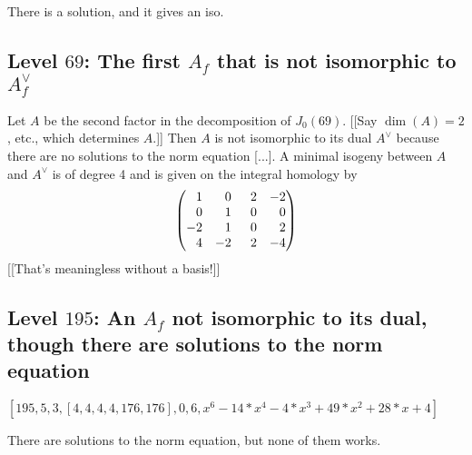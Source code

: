 \documentclass{article}
\begin{document}
There is a solution, and it gives an iso.

\subsection{Level $69$: The first $A_f$ that is not
isomorphic to $A_f^{\vee}$}


Let $A$ be the second factor in the decomposition of $J_0(69)$.
	[[Say $\dim(A) = 2$, etc., which determines $A$.]]
Then $A$ is
not isomorphic to its dual $A^\vee$ because there are no solutions to the norm
equation [...].
A minimal isogeny between $A$ and $A^\vee$ is of degree 4 and is given on the integral
homology by
\[ \left( \begin{matrix}
			\hfill 1 & \hfill 0 & \hfill 2         & -2        \\
			\hfill 0 & \hfill 1 & \hfill 0         & \hfill 0  \\
			-2       & \hfill 1 & \hfill  0        & \hfill  2 \\
			\hfill 4 & -2       & \hspace{1.2ex} 2 & -4\end{matrix} \right)\]
[[That's meaningless without a basis!]]


\subsection{Level $195$: An $A_f$ not isomorphic to
	its dual, though there are solutions to the norm equation}

$[195, 5, 3, [ 4, 4, 4, 4, 176, 176 ], 0, 6, x^6 - 14*x^4 - 4*x^3 + 49*x^2 +
			28*x + 4] $

There are solutions to the norm equation, but none of them works.


\end{document}
